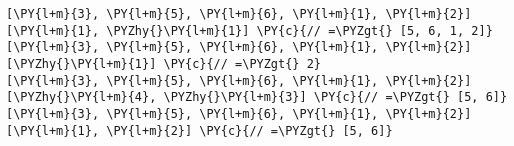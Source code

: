 \begin{Verbatim}[commandchars=\\\{\}]
[\PY{l+m}{3}, \PY{l+m}{5}, \PY{l+m}{6}, \PY{l+m}{1}, \PY{l+m}{2}][\PY{l+m}{1}, \PYZhy{}\PY{l+m}{1}] \PY{c}{// =\PYZgt{} [5, 6, 1, 2]}
[\PY{l+m}{3}, \PY{l+m}{5}, \PY{l+m}{6}, \PY{l+m}{1}, \PY{l+m}{2}][\PYZhy{}\PY{l+m}{1}] \PY{c}{// =\PYZgt{} 2}
[\PY{l+m}{3}, \PY{l+m}{5}, \PY{l+m}{6}, \PY{l+m}{1}, \PY{l+m}{2}][\PYZhy{}\PY{l+m}{4}, \PYZhy{}\PY{l+m}{3}] \PY{c}{// =\PYZgt{} [5, 6]}
[\PY{l+m}{3}, \PY{l+m}{5}, \PY{l+m}{6}, \PY{l+m}{1}, \PY{l+m}{2}][\PY{l+m}{1}, \PY{l+m}{2}] \PY{c}{// =\PYZgt{} [5, 6]}
\end{Verbatim}
